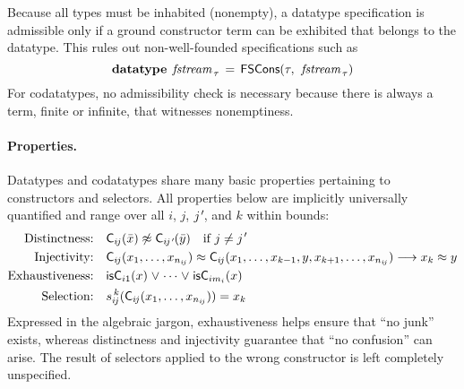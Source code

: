 Because all types must be inhabited (nonempty), a datatype specification is
admissible only if a ground constructor term can be exhibited that belongs to
the datatype. This rules out non-well-founded specifications such as
\[\textbf{datatype}\;\, \textit{fstream}_{\,\tau} \,=\, \textsf{FSCons}(\tau,\:\, \textit{fstream}_{\,\tau})\]
For codatatypes, no admissibility check is necessary because there is always a term,
finite or infinite, that witnesses nonemptiness.
%
%

\paragraph{Properties.}
Datatypes and codatatypes share many basic properties pertaining to
constructors and selectors. All properties below are implicitly universally
quantified and range over all $i$, $j$, $\jPrime$, and $k$ within bounds:
%
\[
\begin{aligned}[t]
\text{Distinctness:}\quad
  & %
    \const{C}_{i\negvthinspace j}(\bar x) \tneq \const{C}_{i\negvthinspace \jPrime}(\bar y) \quad\text{if $j \not= \jPrime$}
  \\
\text{Injectivity:}\quad
  & %
    \const{C}_{i\negvthinspace j}(x_1,\ldots,x_{n_{i\negvthinspace j}}) \teq \const{C}_{i\negvthinspace j}(x_1,\ldots,x_{k-1},y,x_{k+1},\ldots,x_{n_{i\negvthinspace j}}) \longrightarrow x_k \teq y
  \\
\text{Exhaustiveness:}\quad
  & \is{C}_{i1}(x) \mathrel\lor \cdots \mathrel\lor \is{C}_{im_i}(x)
  \\
\text{Selection:}\quad
  & s_{i\negvthinspace j}^{\,k}(\const{C}_{i\negvthinspace j}(x_1,\ldots,x_{n_{i\negvthinspace j}})) = x_k
\end{aligned}
\]
%
Expressed in the algebraic jargon, exhaustiveness helps ensure that ``no
junk'' exists, whereas distinctness and injectivity guarantee that ``no
confusion'' can arise. The result of selectors applied to the wrong
constructor is left completely unspecified.


